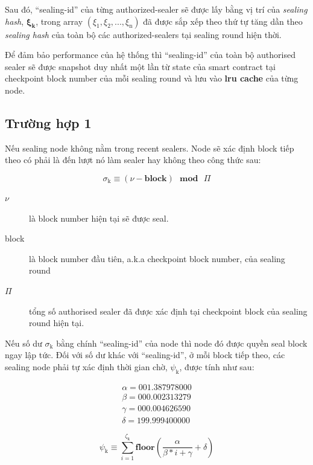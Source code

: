 \documentclass[12pt,oneside]{amsart}
\begin{document}
\begin{multicols}{2}
Sau đó, ``sealing-id'' của từng authorized-sealer sẽ được lấy bằng vị trí của \textit{sealing hash}, $\boldsymbol{\xi_k}$, trong array $(\xi_{\mathrm{1}}, \xi_{\mathrm{2}}, ..., \xi_{\mathrm{n}})$ đã được sắp xếp theo thứ tự tăng dần theo \textit{sealing hash} của toàn bộ các authorized-sealers tại sealing round hiện thời.

Để đảm bảo performance của hệ thống thì ``sealing-id'' của toàn bộ authorised sealer sẽ được snapshot duy nhất một lần từ state của smart contract tại checkpoint block number của mỗi sealing round và lưu vào \textbf{lru cache} của từng node.

\subsection{Trường hợp 1} Nếu sealing node không nằm trong recent sealers. Node sẽ xác định block tiếp theo có phải là đến lượt nó làm sealer hay không theo công thức sau:

\begin{equation}\label{eq:sigma}
\sigma_{\mathrm{k}} \equiv (\nu - \mathbf{block}) \ \ \ \mathbf{mod} \ \ \ \Pi
\end{equation}

\begin{description}
\item[$\nu$] là block number hiện tại sẽ được seal.
\item[block] là block number đầu tiên, a.k.a checkpoint block number, của sealing round
\item[$\Pi$] tổng số authorised sealer đã được xác định tại checkpoint block của sealing round hiện tại.
\end{description}

Nếu số dư $\sigma_{\mathrm{k}}$ bằng chính ``sealing-id'' của node thì node đó được quyền seal block ngay lập tức. Đối với số dư khác với ``sealing-id'', ở mỗi block tiếp theo, các sealing node phải tự xác định thời gian chờ, $\psi_{\mathrm{k}}$, được tính như sau:

\begin{eqnarray}
\alpha = 001.387978000 \\
\beta = 000.002313279 \\
\gamma = 000.004626590 \\
\delta = 199.999400000
\end{eqnarray}

\begin{equation}\label{eq:psi}
\psi_{\mathrm{k}} \equiv \sum_{i=1}^{\zeta_\mathrm{k}} \mathbf{floor}(\frac{\alpha}{\beta*i+\gamma} + \delta)
\end{equation}


\end{multicols}
\end{document}
